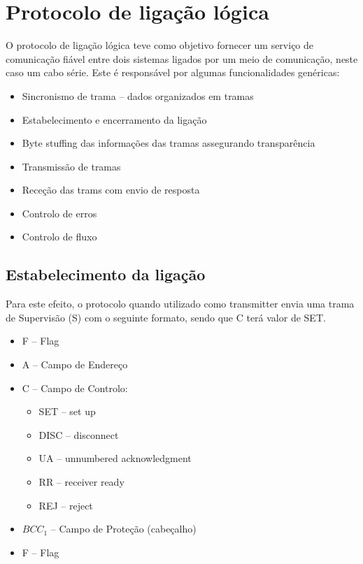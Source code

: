 \documentclass[a4paper,11pt,portuguese]{article}
\begin{document}
\section{Protocolo de ligação lógica}

    O protocolo de ligação lógica teve como objetivo fornecer um serviço de comunicação fiável entre
    dois sistemas ligados por um meio de comunicação, neste caso um cabo série. Este é responsável
    por algumas funcionalidades genéricas:
    \begin{itemize}
        \item Sincronismo de trama -- dados organizados em tramas
        \item Estabelecimento e encerramento da ligação
        \item Byte stuffing das informações das tramas assegurando transparência
        \item Transmissão de tramas
        \item Receção das trams com envio de resposta
        \item Controlo de erros
        \item Controlo de fluxo
    \end{itemize}
    
    \subsection{Estabelecimento da ligação}

    Para este efeito, o protocolo quando utilizado como transmitter envia uma trama de Supervisão (S) 
    com o seguinte formato, sendo que C terá valor de SET.

    \begin{itemize}
        \item F -- Flag
        \item A -- Campo de Endereço
        \item C -- Campo de Controlo:
            \begin{itemize}
                \item SET -- set up
                \item DISC -- disconnect
                \item UA -- unnumbered acknowledgment
                \item RR -- receiver ready
                \item REJ -- reject 
            \end{itemize}
        \item $BCC_1$ -- Campo de Proteção (cabeçalho) 
        \item F -- Flag
    \end{itemize}
\end{document}

